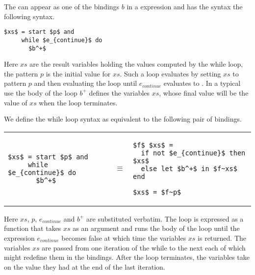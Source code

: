 \begin{syntax}
\label{syn:language::while}
The  can appear as one of the bindings $b$ in a
\clet expression and has the syntax the following syntax.
%
\begin{lstlisting}
$xs$ = start $p$ and
     while $e_{continue}$ do
       $b^+$
\end{lstlisting}
%
Here $xs$ are the result variables holding the values computed by the
while loop, the pattern $p$ is the initial value for $xs$.
%
Such a  loop evaluates by setting $xs$ to pattern $p$ and
then evaluating the loop until $e_{continue}$ evaluates to \cfalse.
%
In a typical use the body of the loop $b^+$ defines the variables
$xs$, whose final value will be the value of $xs$ when the loop terminates.

We define the while loop syntax as equivalent to the
following pair of bindings.

\begin{tabular}{lcl}
\begin{minipage}[t]{2.5in}
\begin{lstlisting}
$xs$ = start $p$ and
     while $e_{continue}$ do
       $b^+$
\end{lstlisting}
\end{minipage}
&
\begin{minipage}[t]{5mm}
\vspace{1cm}
$\equiv$
\vspace{1cm}
\end{minipage}
&
\begin{minipage}[t]{2in}
\begin{lstlisting}
$f$ $xs$ = 
  if not $e_{continue}$ then $xs$
  else let $b^+$ in $f~xs$ end

$xs$ = $f~p$
\end{lstlisting}


\end{minipage}
\end{tabular}


Here $xs$, $p$, $e_{continue}$ and $b^+$ are substituted
verbatim.  
%
The loop is expressed as a function that takes $xs$ as an argument and
runs the body of the loop until the expression $e_{continue}$ becomes
false at which time the variables $xs$ is returned.
%
The variables $xs$ are passed from one iteration of the while to the next
each of which might redefine them in the bindings.  
%
After the loop terminates, the variables take on the value they had at
the end of the last iteration.

\end{syntax}

